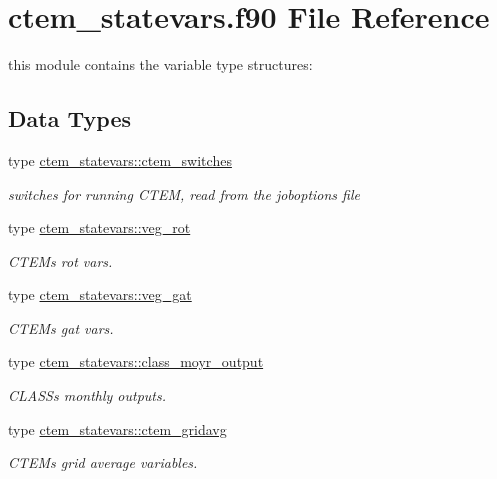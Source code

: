 \hypertarget{ctem__statevars_8f90}{}\section{ctem\+\_\+statevars.\+f90 File Reference}
\label{ctem__statevars_8f90}


this module contains the variable type structures\+:  


\subsection*{Data Types}
\begin{DoxyCompactItemize}
\item 
type \hyperlink{structctem__statevars_1_1ctem__switches}{ctem\+\_\+statevars\+::ctem\+\_\+switches}
\begin{DoxyCompactList}\small\item\em switches for running C\+T\+E\+M, read from the joboptions file \end{DoxyCompactList}\item 
type \hyperlink{structctem__statevars_1_1veg__rot}{ctem\+\_\+statevars\+::veg\+\_\+rot}
\begin{DoxyCompactList}\small\item\em C\+T\+E\+M\textquotesingle{}s \textquotesingle{}rot\textquotesingle{} vars. \end{DoxyCompactList}\item 
type \hyperlink{structctem__statevars_1_1veg__gat}{ctem\+\_\+statevars\+::veg\+\_\+gat}
\begin{DoxyCompactList}\small\item\em C\+T\+E\+M\textquotesingle{}s \textquotesingle{}gat\textquotesingle{} vars. \end{DoxyCompactList}\item 
type \hyperlink{structctem__statevars_1_1class__moyr__output}{ctem\+\_\+statevars\+::class\+\_\+moyr\+\_\+output}
\begin{DoxyCompactList}\small\item\em C\+L\+A\+S\+S\textquotesingle{}s monthly outputs. \end{DoxyCompactList}\item 
type \hyperlink{structctem__statevars_1_1ctem__gridavg}{ctem\+\_\+statevars\+::ctem\+\_\+gridavg}
\begin{DoxyCompactList}\small\item\em C\+T\+E\+M\textquotesingle{}s grid average variables. \end{DoxyCompactList}\item 

\end{DoxyCompactItemize}
